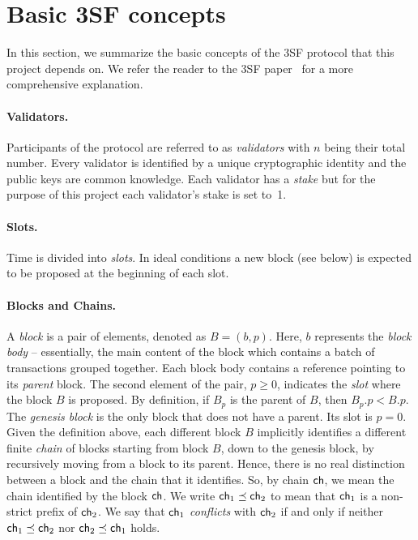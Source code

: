 
\section{Basic 3SF concepts}\label{sec:3sf}

In this section, we summarize the basic concepts of the 3SF protocol that this project depends on.
We refer the reader to the 3SF paper~\cite{d20243} for a more comprehensive explanation.

\paragraph*{Validators.} Participants of the protocol are referred to as \emph{validators} with $n$ being their total number.
Every validator is identified by a unique cryptographic identity and the public keys are common knowledge. 
Each validator has a \emph{stake} but for the purpose of this project each validator's stake is set to~1.

\paragraph*{Slots.} Time is divided into \emph{slots}. 
In ideal conditions a new block (see below) is expected to be proposed at the beginning of each slot.

\paragraph{Blocks and Chains.} 
A \emph{block} is a pair of elements, denoted as \( B = (b,p) \). Here, \( b \) represents the \emph{block body} -- essentially, the main content of the block which contains a batch of transactions grouped together.
Each block body contains a reference pointing to its \emph{parent} block. 
The second element of the pair, \( p \geq 0 \), indicates the \emph{slot} where the block \( B \) is proposed.
By definition, if $B_p$ is the parent of $B$, then $B_p.p < B.p$.
The \emph{genesis block} is the only block that does not have a parent. Its slot is \( p = 0 \).
Given the definition above, each different block $B$ implicitly identifies a different finite \emph{chain} of blocks starting from block $B$, down to the genesis block, by recursively moving from a block to its parent.
Hence, there is no real distinction between a block and the chain that it identifies.
So, by chain $\mathsf{ch}$, we mean the chain identified by the block $\mathsf{ch}$.
We write $\mathsf{ch}_1 \preceq \mathsf{ch}_2$ to mean that $\mathsf{ch}_1$ is a non-strict prefix of $\mathsf{ch}_2$.
We say that $\mathsf{ch}_1$ \emph{conflicts} with $\mathsf{ch}_2$ if and only if neither $\mathsf{ch}_1 \preceq \mathsf{ch}_2$ nor $\mathsf{ch}_2 \preceq \mathsf{ch}_1$ holds. 

